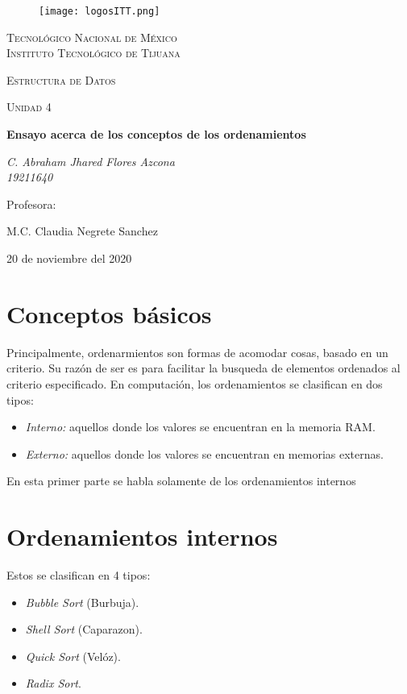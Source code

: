 \documentclass[letterpaper, 12pt]{article}
\begin{document}
    
    \begin{titlepage}
        \begin{figure}[ht]
            \centering
            \texttt{[image: logosITT.png]}
        \end{figure}
        \centering
        {\scshape\LARGE Tecnológico Nacional de México\\Instituto Tecnológico de Tijuana\par}
        \vspace{1cm}
        {\scshape\Large Estructura de Datos\par}
        \vspace{1cm}
        {\scshape\Large Unidad 4\par}
        \vspace{1.5cm}
        {\huge\bfseries Ensayo acerca de los conceptos de los ordenamientos\par}
        \vspace{2cm}
        {\Large\itshape C. Abraham Jhared Flores Azcona\\19211640\par}
        \vfill
        Profesora: \par
        M.C. Claudia Negrete Sanchez
        
        \vfill

        {\large 20 de noviembre del 2020}
    \end{titlepage}

    \newpage
    \thispagestyle{fancy}
    \setcounter{page}{1}
    \section{Conceptos básicos}
    Principalmente, ordenarmientos son formas de acomodar cosas, basado en un criterio. Su razón de ser es para facilitar la busqueda de elementos ordenados al criterio especificado. En computación, los ordenamientos se clasifican en dos tipos:
    \begin{itemize}
        \item \emph{Interno: }aquellos donde los valores se encuentran en la memoria RAM.
        \item \emph{Externo: }aquellos donde los valores se encuentran en memorias externas.
    \end{itemize}
    En esta primer parte se habla solamente de los ordenamientos internos
    \section{Ordenamientos internos}
    Estos se clasifican en 4 tipos:
    \begin{itemize}
        \item \emph{Bubble Sort} (Burbuja).
        \item \emph{Shell Sort} (Caparazon).
        \item \emph{Quick Sort} (Velóz).
        \item \emph{Radix Sort}.
    \end{itemize}
\end{document}
